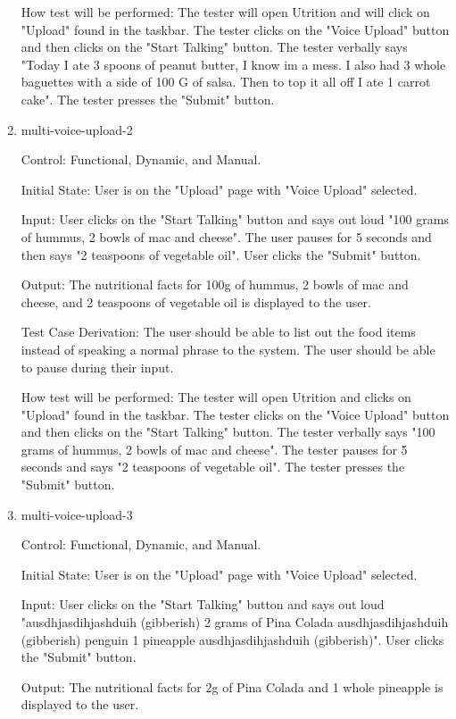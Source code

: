 \documentclass[12pt, titlepage]{article}
\begin{document}
\begin{enumerate}
	How test will be performed: The tester will open Utrition and will click on "Upload" found in the taskbar. The tester clicks on the "Voice Upload" button and then clicks on the "Start Talking" button. The tester verbally says "Today I ate 3 spoons of peanut butter, I know im a mess. I also had 3 whole baguettes with a side of 100 G of salsa. Then to top it all off I ate 1 carrot cake". The tester presses the "Submit" button.
	
	\item{multi-voice-upload-2\\}
	
	Control: Functional, Dynamic, and Manual.
	
	Initial State: User is on the "Upload" page with "Voice Upload" selected.
	
	Input: User clicks on the "Start Talking" button and says out loud "100 grams of hummus, 2 bowls of mac and cheese". The user pauses for 5 seconds and then says "2 teaspoons of vegetable oil". User clicks the "Submit" button.
	
	Output: The nutritional facts for 100g of hummus, 2 bowls of mac and cheese, and 2 teaspoons of vegetable oil is displayed to the user.
	
	Test Case Derivation: The user should be able to list out the food items instead of speaking a normal phrase to the system. The user should be able to pause during their input.
	
	How test will be performed: The tester will open Utrition and clicks on "Upload" found in the taskbar. The tester clicks on the "Voice Upload" button and then clicks on the "Start Talking" button. The tester verbally says "100 grams of hummus, 2 bowls of mac and cheese". The tester pauses for 5 seconds and says "2 teaspoons of vegetable oil". The tester presses the "Submit" button.
	
	\item{multi-voice-upload-3\\}
	
	Control: Functional, Dynamic, and Manual.
	
	Initial State: User is on the "Upload" page with "Voice Upload" selected.
	
	Input: User clicks on the "Start Talking" button and says out loud "ausdhjasdihjashduih (gibberish) 2 grams of Pina Colada ausdhjasdihjashduih (gibberish) penguin 1 pineapple ausdhjasdihjashduih (gibberish)". User clicks the "Submit" button.
	
	Output: The nutritional facts for 2g of Pina Colada and 1 whole pineapple is displayed to the user.
	

\end{enumerate}
\end{document}

